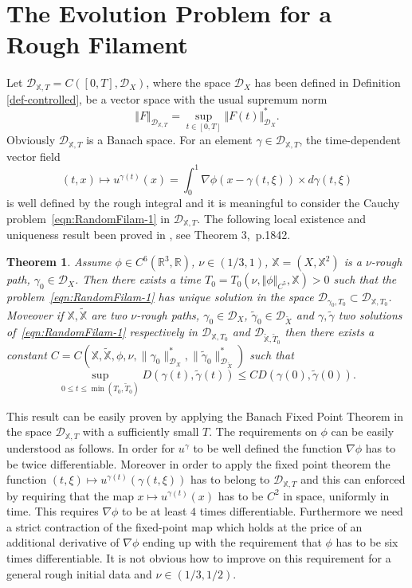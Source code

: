 \documentclass[11pt,a4paper,reqno]{amsart}%
\theoremstyle{plain}
\newtheorem{theorem}{Theorem}[section]
\theoremstyle{remark}
\theoremstyle{plain}
\numberwithin{equation}{section}
\def\Rnu{{\mathbb R}}
\def\supl{\sup\limits}
\def\supl{\mathop{\sup}\limits}
\begin{document}
\section{The Evolution Problem for a Rough Filament}
Let $\mathcal{D}_{\mathbb{X},T}=C([0,T],\mathcal{D}_X)$, where the space $\mathcal{D}_X$ has been defined in Definition \ref{def-controlled},  be a
vector space with the usual supremum norm
\begin{equation}
\Vert F\Vert_{\mathcal{D}_{\mathbb{X},T}}=\supl_{t\in[0,T]}\Vert F(t)\Vert_{\mathcal{D}_X}^*\label{eqn:NormDef}.
\end{equation}
Obviously $\mathcal{D}_{\mathbb{X},T}$ is a Banach space. For an element $\gamma \in \mathcal{D}_{\mathbb{X},T}$, the time-dependent vector field
$$
(t,x)\mapsto u^{\gamma(t)}(x) =\int_0^1 \nabla \phi(x-\gamma(t,\xi)) \times d\gamma(t,\xi)
$$
is well defined by the rough integral and it is meaningful to consider the  Cauchy problem~\eqref{eqn:RandomFilam-1} in $\mathcal{D}_{\mathbb{X},T}$.
The following local existence and uniqueness result been proved in \cite{[Bess+Gub_2005]}, see Theorem
$3$,~p.1842.
\begin{theorem}\label{thm:LocalExistUniq}
Assume $\phi\in C^6(\Rnu^3,\Rnu)$, $\nu\in ({1}/{3},1)$,
$\mathbb{X}=(X,\mathbb{X}^2)$ is a $\nu$-rough path, $\gamma_0\in
\mathcal{D}_X$. Then there exists a time
$T_0=T_0(\nu,\Vert \phi\Vert_{C^5},\mathbb{X})>0$ such that the problem~\eqref{eqn:RandomFilam-1} has unique
solution in the space  $\mathcal{D}_{\gamma_0,T_0}\subset\mathcal{D}_{\mathbb{X},T_0}$. Moveover if $\mathbb{X}, \tilde{\mathbb{X}}$ are two $\nu$-rough paths, $\gamma_0\in \mathcal{D}_X$, $\tilde \gamma_0\in
\mathcal{D}_{\tilde{X}}$ and $\gamma,\tilde \gamma$  two solutions of~\eqref{eqn:RandomFilam-1} respectively in $\mathcal{D}_{\mathbb{X},T_0}$ and $\mathcal{D}_{\tilde{\mathbb{X}},\tilde T_0}$ then there exists a constant $C=C(\mathbb{X},\tilde{\mathbb{X}},\phi,\nu,\|\gamma_0\|_{\mathcal{D}_X}^*,\|\tilde \gamma_0\|_{\mathcal{D}_{\tilde{X}}}^*)$ such that
$$
\sup_{0\le t\le \min(T_0,\tilde T_0)} D(\gamma(t),\tilde \gamma(t)) \le C D(\gamma(0),\tilde \gamma(0)) .
$$
\end{theorem}
This result can be easily proven by applying the Banach  Fixed Point Theorem in the space $\mathcal{D}_{\mathbb{X},T}$  with a sufficiently small $T$. The requirements on $\phi$ can be easily understood as follows. In order for $u^\gamma$ to be well defined the function $\nabla \phi$ has to be twice differentiable. Moreover in order to apply the fixed point theorem the function $(t,\xi) \mapsto u^{\gamma(t)}(\gamma(t,\xi))$ has to belong to  $\mathcal{D}_{\mathbb{X},T}$ and this can enforced by requiring that the map $x \mapsto u^{\gamma(t)}(x)$ has to be $C^2$ in space, uniformly in time. This requires $\nabla \phi$ to be at least $4$ times differentiable.  Furthermore we need  a strict contraction of the fixed-point map which holds at the price of an additional derivative of $\nabla \phi$ ending up with the requirement that $\phi$ has to be six times differentiable. It is not obvious how to improve on this requirement for a general rough  initial data and $\nu\in(1/3,1/2)$.
\end{document}
